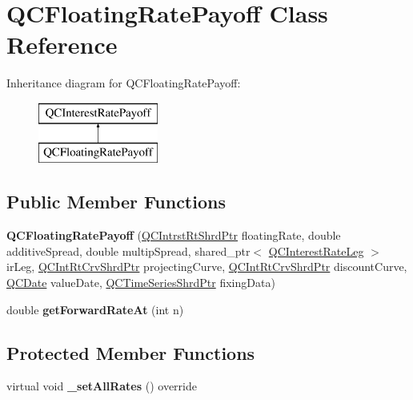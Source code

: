 \hypertarget{class_q_c_floating_rate_payoff}{\section{Q\+C\+Floating\+Rate\+Payoff Class Reference}
\label{class_q_c_floating_rate_payoff}
}
Inheritance diagram for Q\+C\+Floating\+Rate\+Payoff\+:\begin{figure}[H]
\begin{center}
\leavevmode
\includegraphics[height=2.000000cm]{class_q_c_floating_rate_payoff}
\end{center}
\end{figure}
\subsection*{Public Member Functions}
\begin{DoxyCompactItemize}
\item 
\hypertarget{class_q_c_floating_rate_payoff_ae06ea612302b5cb0cc88ec8a893e1fc1}{{\bfseries Q\+C\+Floating\+Rate\+Payoff} (\hyperlink{_q_c_definitions_8h_ae6a21ad26d19e482e3b01179cbc05298}{Q\+C\+Intrst\+Rt\+Shrd\+Ptr} floating\+Rate, double additive\+Spread, double multip\+Spread, shared\+\_\+ptr$<$ \hyperlink{class_q_c_interest_rate_leg}{Q\+C\+Interest\+Rate\+Leg} $>$ ir\+Leg, \hyperlink{_q_c_definitions_8h_a4b4fb466e49550e3dfd40003562cd19d}{Q\+C\+Int\+Rt\+Crv\+Shrd\+Ptr} projecting\+Curve, \hyperlink{_q_c_definitions_8h_a4b4fb466e49550e3dfd40003562cd19d}{Q\+C\+Int\+Rt\+Crv\+Shrd\+Ptr} discount\+Curve, \hyperlink{class_q_c_date}{Q\+C\+Date} value\+Date, \hyperlink{_q_c_definitions_8h_a6a601ffd693c05dd81309e3dca08b8f5}{Q\+C\+Time\+Series\+Shrd\+Ptr} fixing\+Data)}\label{class_q_c_floating_rate_payoff_ae06ea612302b5cb0cc88ec8a893e1fc1}

\item 
\hypertarget{class_q_c_floating_rate_payoff_a97363c05d03138861929b638a3485e4b}{double {\bfseries get\+Forward\+Rate\+At} (int n)}\label{class_q_c_floating_rate_payoff_a97363c05d03138861929b638a3485e4b}

\end{DoxyCompactItemize}
\subsection*{Protected Member Functions}
\begin{DoxyCompactItemize}
\item 
\hypertarget{class_q_c_floating_rate_payoff_a2c3247fbd8c5cf5398dfb465c42d84ca}{virtual void {\bfseries \+\_\+set\+All\+Rates} () override}\label{class_q_c_floating_rate_payoff_a2c3247fbd8c5cf5398dfb465c42d84ca}

\end{DoxyCompactItemize}
